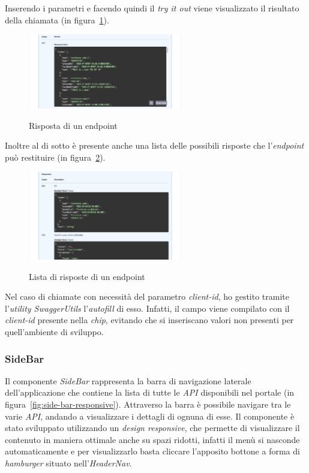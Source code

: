 Inserendo i parametri e facendo quindi il \textit{try it out} viene visualizzato il risultato della chiamata (in figura~\ref{fig:risposta-endpoint}).

\begin{figure}[ht]
  \centering
  \includegraphics[width=0.6\textwidth, alt={Sezione per la visualizzazione della risposta di un endpoint}]{images/frontend/TryItOut3.jpg}
  \caption{Risposta di un endpoint}\label{fig:risposta-endpoint}
\end{figure}

Inoltre al di sotto è presente anche una lista delle possibili risposte che l'\textit{endpoint} può restituire (in figura~\ref{fig:response-list}).

\begin{figure}[ht]
  \centering
  \includegraphics[width=0.6\textwidth, alt={Sezione per la visualizzazione delle possibili risposte di un endpoint}]{images/frontend/TryItOut4.jpg}
  \caption{Lista di risposte di un endpoint}\label{fig:response-list}
\end{figure}

\pagebreak

Nel caso di chiamate con necessità del parametro \textit{client-id}, ho gestito tramite l'\textit{utility SwaggerUtils} l'\textit{autofill} di esso.
Infatti, il campo viene compilato con il \textit{client-id} presente nella \textit{chip}, evitando che si inseriscano valori non presenti per 
quell'ambiente di sviluppo.


\subsubsection{SideBar}\label{subsubsec:side-bar}
Il componente \textit{SideBar} rappresenta la barra di navigazione laterale dell'applicazione che contiene la lista di tutte le \textit{API} disponibili nel portale (in figura~\ref{fig:side-bar-responsive}).
Attraverso la barra è possibile navigare tra le varie \textit{API}, andando a visualizzare i dettagli di ognuna di esse. 
Il componente è stato sviluppato utilizzando un \textit{design responsive}, che permette di visualizzare il contenuto in maniera ottimale anche su spazi ridotti, 
infatti il menù si nasconde automaticamente e per visualizzarlo basta cliccare l'apposito bottone a forma di \textit{hamburger} situato nell'\textit{HeaderNav}.\\

